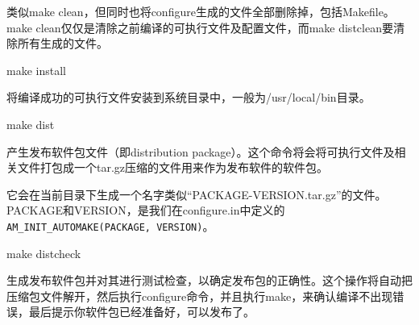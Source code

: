 类似make clean，但同时也将configure生成的文件全部删除掉，包括Makefile。
make clean仅仅是清除之前编译的可执行文件及配置文件，而make distclean要清除所有生成的文件。

make install

将编译成功的可执行文件安装到系统目录中，一般为/usr/local/bin目录。

make dist

产生发布软件包文件（即distribution package）。这个命令将会将可执行文件及相关文件打包成一个tar.gz压缩的文件用来作为发布软件的软件包。

它会在当前目录下生成一个名字类似“PACKAGE-VERSION.tar.gz”的文件。PACKAGE和VERSION，是我们在configure.in中定义的\verb*|AM_INIT_AUTOMAKE(PACKAGE, VERSION)|。

make distcheck

生成发布软件包并对其进行测试检查，以确定发布包的正确性。这个操作将自动把压缩包文件解开，然后执行configure命令，并且执行make，来确认编译不出现错误，最后提示你软件包已经准备好，可以发布了。





























